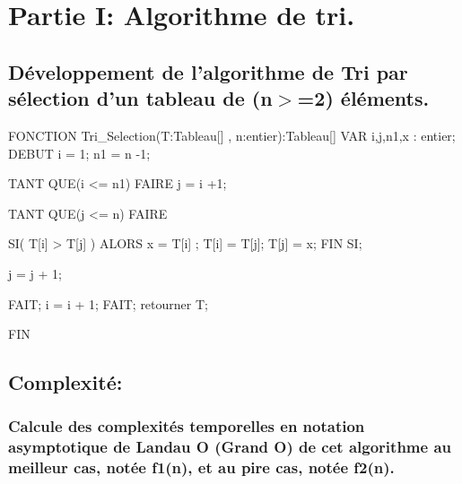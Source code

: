 \documentclass[12pt]{article}
\begin{document}
\def\reportnumber{3}
\def\reporttitle{Algorithmes de Complexité temporelle quadratique O(n²)}


\section{Partie I: Algorithme de tri.}

\subsection{Développement de l'algorithme de Tri par sélection d'un tableau de (n$>$=2) éléments. }

\begin{sql}

 FONCTION Tri_Selection(T:Tableau[] , n:entier):Tableau[]
VAR
	i,j,n1,x : entier;
DEBUT
	i = 1;
	n1 = n -1;
	
	TANT QUE(i <= n1)
	FAIRE
		j = i +1;
		
		TANT QUE(j <= n)
		FAIRE
			
			SI( T[i] > T[j] )
			ALORS
				x = T[i] ;
				T[i] = T[j];
				T[j] = x;
			FIN SI;
			
			j = j + 1;
			
		FAIT;
		i = i + 1;	
	FAIT;
	retourner T;

FIN
 
\end{sql}

\subsection{Complexité:}

\subsubsection{Calcule des complexités temporelles en notation asymptotique de Landau O (Grand O) de  cet  algorithme au meilleur cas, notée f1(n), et au pire cas, notée f2(n). }
\end{document}
